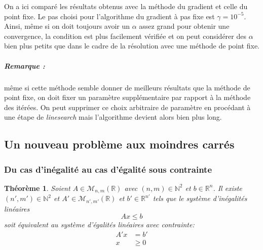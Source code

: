 \documentclass[10pt,a4paper]{article}
\newtheorem{thm}{Théorème}
\begin{document}
On a ici comparé les résultats obtenus avec la méthode du gradient et celle du point fixe. Le pas choisi pour l'algorithme du gradient à pas fixe est $\gamma = 10^{-5}$. Ainsi, même si on doit toujours avoir un $\alpha$ assez grand pour obtenir une convergence, la condition est plus facilement vérifiée et on peut considérer des $\alpha$ bien plus petits que dans le cadre de la résolution avec une méthode de point fixe. 
\subparagraph{Remarque :} même si cette méthode semble donner de meilleurs résultats que la méthode de point fixe, on doit fixer un paramètre supplémentaire par rapport à la méthode des itérées. On peut supprimer ce choix arbitraire de paramètre en procédant à une étape de \textit{linesearch} mais l'algorithme devient alors bien plus long.
\subsection{Un nouveau problème aux moindres carrés}

\subsubsection{Du cas d'inégalité au cas d'égalité sous contrainte}
\label{passage}
\begin{thm}
  Soient $A \in \mathcal{M}_{n,m}(\mathbb{R})$ avec $(n,m) \in \mathbb{N}^2$ et $b \in \mathbb{R}^{n}$.
  Il existe $(n', m') \in \mathbb{N}^2$ et $A' \in \mathcal{M}_{n',m'}(\mathbb{R})$ et $b' \in \mathbb{R}^{n'}$ tels que le système d'inégalités linéaires 
\begin{equation}
  Ax \leq b
\end{equation}
soit équivalent au système d'égalités linéaires avec contrainte:
\begin{equation}
\begin{aligned}
  A'x &= b'\\
  x &\geq 0\\
  \end{aligned}
\end{equation}
\end{thm}
\end{document}
